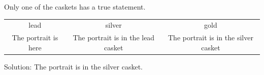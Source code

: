 Only one of the caskets has a true statement.
\begin{tabular}{ccc}
\toprule
lead & silver & gold\\
The portrait is here & The portrait is in the lead casket & The portrait is in the silver casket\\
\bottomrule
\end{tabular}
Solution: The portrait is in the silver casket.